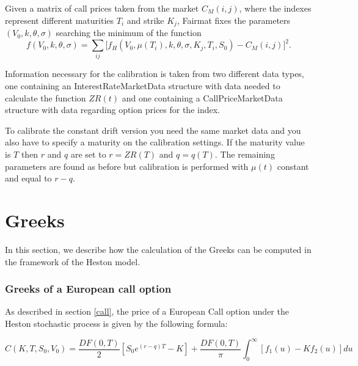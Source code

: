 Given a matrix of call prices taken from the market $C_M(i,j)$, where the indexes represent different maturities $T_i$ and strike $K_j$, Fairmat fixes the parameters $(V_0, k, \theta, \sigma)$ searching the minimum of the function
\begin{equation}
f(V_0, k, \theta, \sigma) = \sum_{ij}\Big[f_H(V_0, \mu(T_i), k, \theta, \sigma, K_j, T_i, S_0) - C_M(i,j)\Big]^2.
\end{equation}

Information necessary for the calibration is taken from two different data types, one containing an InterestRateMarketData  structure with data needed to calculate the function $ZR(t)$ and one containing a CallPriceMarketData structure with data regarding option prices for the index.

To calibrate the constant drift version you need the same market data and you also have to specify a maturity on the calibration settings. If the maturity value is $T$ then $r$ and $q$ are set to $r = ZR(T)$ and $q = q(T)$. The remaining parameters are found as before but calibration is performed with $\mu(t)$ constant and equal to $r-q$.




\section{Greeks}
In this section, we describe how the calculation of the Greeks can be computed in the framework of the Heston model. 


\subsubsection{Greeks of a European call option}
As described in section \ref{call}, the price of a European Call option under the Heston stochastic process is given by the following formula:

$$
C(K,T, S_0, V_0) = 
\frac{DF(0,T)}{2}\left[S_0e^{(r-q) T} - K\right] + \frac{DF(0,T)}{\pi}\int_0^{\infty}\left[f_1(u) - Kf_2(u)\right]du
$$


